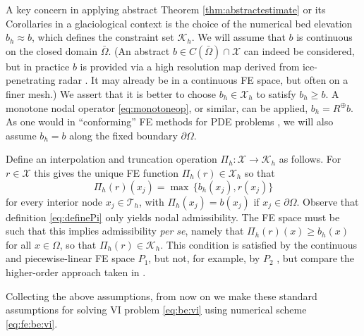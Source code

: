 \documentclass[hidelinks,onefignum,onetabnum,final]{siamart220329}  %
\newcommand{\cK}{\mathcal{K}}
\newcommand{\cT}{\mathcal{T}}
\newcommand{\cX}{\mathcal{X}}
\begin{document}
A key concern in applying abstract Theorem \ref{thm:abstractestimate} or its Corollaries in a glaciological context is the choice of the numerical bed elevation $b_h \approx b$, which defines the constraint set $\cK_h$.  We will assume that $b$ is continuous on the closed domain $\bar\Omega$.  (An abstract $b\in C(\bar\Omega) \cap \cX$ can indeed be considered, but in practice $b$ is provided via a high resolution map derived from ice-penetrating radar \cite{Morlighemetal2017}.  It may already be in a continuous FE space, but often on a finer mesh.)  We assert that it is better to choose $b_h \in \cX_h$ to satisfy $b_h\ge b$.  A monotone nodal operator \eqref{eq:monotoneop}, or similar, can be applied, $b_h = R^\oplus b$.  As one would in ``conforming'' FE methods for PDE problems \cite{Elmanetal2014}, we will also assume $b_h=b$ along the fixed boundary $\partial\Omega$.

Define an interpolation and truncation operation $\Pi_h : \cX \to \cK_h$ as follows.  For $r\in\cX$ this gives the unique FE function $\Pi_h(r) \in \cX_h$ so that
\begin{equation}
\Pi_h(r)(x_j) = \max \,\{b_h(x_j), r(x_j)\} \label{eq:definePi}
\end{equation}
for every interior node $x_j \in \cT_h$, with $\Pi_h(x_j)=b(x_j)$ if $x_j\in\partial\Omega$.  Observe that definition \eqref{eq:definePi} only yields nodal admissibility.  The FE space must be such that this implies admissibility \emph{per se}, namely that $\Pi_h(r)(x) \ge b_h(x)$ for all $x \in \Omega$, so that $\Pi_h(r) \in \cK_h$.  This condition is satisfied by the continuous and piecewise-linear FE space $P_1$, but not, for example, by $P_2$ \cite{BuelerFarrell2024}, but compare the higher-order approach taken in \cite{KeithSurowiec2023}.

Collecting the above assumptions, from now on we make these standard assumptions for solving VI problem \eqref{eq:be:vi} using numerical scheme \eqref{eq:fe:be:vi}.
\end{document}
